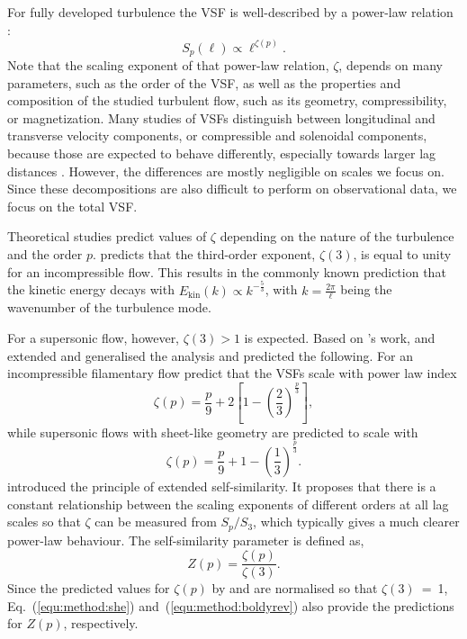 For fully developed turbulence the VSF is well-described by a power-law relation \citep{Kolmogorov1941,She1994,Boldyrev2002}:
\begin{equation}
	\mathit{S}_p (\ell) \propto \ell^{\zeta(p)}.
	\label{equ:method:propto_zeta}
\end{equation}
Note that the scaling exponent of that power-law relation, $\zeta$, depends on many parameters, such as the order of the VSF, as well as the properties and composition of the studied turbulent flow, such as its geometry, compressibility, or magnetization.
Many studies of VSFs distinguish between longitudinal and transverse velocity components, or compressible and solenoidal components, because those are expected to behave differently, especially towards larger lag distances \citep{Gotoh2002,Schmidt2008,Benzi2010}.
However, the differences are mostly negligible on scales we focus on. 
Since these decompositions are also difficult to perform on observational data, we focus on the total VSF.

Theoretical studies predict values of $\zeta$ depending on the nature of the turbulence and the order $p$.
\citet{Kolmogorov1941} predicts that the third-order exponent, $\zeta(3)$, is equal to unity for an incompressible flow.
This results in the commonly known prediction that the kinetic energy decays with $E_{\mathrm{kin}}(k) \propto k^{-\frac{5}{3}}$, with $k = \frac{2 \pi}{\ell}$ being the wavenumber of the turbulence mode.

For a supersonic flow, however, $\zeta(3) >1$ is expected.
Based on \citeauthor{Kolmogorov1941}'s work, \citet{She1994} and \citet{Boldyrev2002} extended and generalised the analysis and predicted the following.
For an incompressible filamentary flow \citet{She1994} predict that
the VSFs scale with power law index
\begin{equation}
	\zeta(p) = \frac{p}{9} + 2 \left[ 1 - \left( \frac{2}{3} \right)^{\frac{p}{3}} \right] ,
	\label{equ:method:she}
\end{equation}
while supersonic flows with sheet-like geometry are predicted to scale with \citep{Boldyrev2002}
\begin{equation}
	\zeta(p) = \frac{p}{9} + 1 - \left( \frac{1}{3} \right)^{\frac{p}{3}}.
	\label{equ:method:boldyrev}
\end{equation}
\citet{Benzi1993} introduced the principle of extended self-similarity.
It proposes that there is a constant relationship between the scaling
exponents of different orders at all lag scales so that $\zeta$ can be measured from $S_p/S_3$, which typically gives a much clearer power-law behaviour.
The self-similarity parameter is defined as,
\begin{equation}
	Z(p) = \frac{\zeta(p)}{\zeta(3)}.
	\label{equ:method:z_def}
\end{equation} 
Since the predicted values for $\zeta(p)$ by \citet{She1994} and \citet{Boldyrev2002} are normalised so that $\zeta(3)$~=~1, Eq.~(\ref{equ:method:she}) and~(\ref{equ:method:boldyrev}) also provide the predictions for $Z(p)$, respectively.


